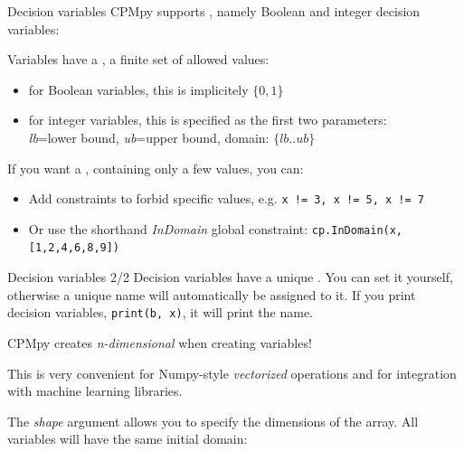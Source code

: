 \documentclass{cons-beamer}
\begin{document}
\begin{flashcardcpmpy}
\begin{frame}{Decision variables}
  CPMpy supports , namely Boolean and integer decision variables:

  

  \vspace{1em}
  Variables have a , a finite set of allowed values:
  \begin{itemize}
    \item for {Boolean} variables, this is implicitely $\{0,1\}$
    \item for {integer} variables, this is specified as the first two parameters: \\
    \textit{lb}=lower bound, \textit{ub}=upper bound, domain: $\{lb..ub\}$
  \end{itemize}

  \vspace{1em}
  If you want a , containing only a few values, you can:
  \begin{itemize}
      \item Add constraints to forbid specific values, e.g. \lstinline[language=cpmpy]{x != 3, x != 5, x != 7}
      \item Or use the shorthand \textit{InDomain} global constraint: \lstinline[language=cpmpy]{cp.InDomain(x, [1,2,4,6,8,9])}
  \end{itemize}
\end{frame}

\begin{frame}{Decision variables 2/2}
  Decision variables have a unique . You can set it yourself, otherwise a unique name will automatically be assigned to it. If you print decision variables, \lstinline[language=cpmpy]{print(b, x)}, it will print the name.

  \vspace{1em}
  CPMpy creates \emph{n-dimensional}  when creating variables!

  This is very convenient for Numpy-style \emph{vectorized} operations and for integration with machine learning libraries.

  \vspace{1em}
  The \emph{shape} argument allows you to specify the dimensions of the array. All variables will have the same initial domain:
  
\end{frame}


\end{flashcardcpmpy}
\end{document}
